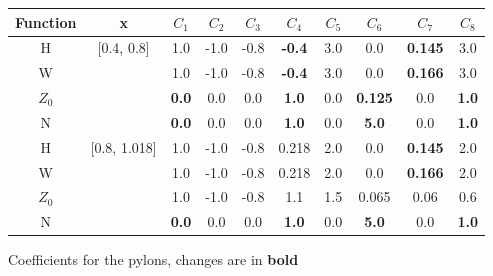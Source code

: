 \documentclass[12pt]{article}
\begin{document}
\begin{figure}[ht]
\begin{centering}
\begin{small}
\begin{tabular}{cccccccccc}
Function & x & $C_{1}$ & $C_{2}$ & $C_{3}$ & $C_{4}$ & $C_{5}$ & $C_{6}$ & $C_{7}$ & $C_{8}$ \\
\hline
H          & [0.4, 0.8]  & 1.0             & -1.0 & -0.8 & \textbf{-0.4} & 3.0 & 0.0                  & \textbf{0.145} & 3.0 \\
W          &                 & 1.0             & -1.0 & -0.8 & \textbf{-0.4} & 3.0 & 0.0                  & \textbf{0.166} & 3.0 \\
$Z_{0}$ &                 & \textbf{0.0} & 0.0  & 0.0  & \textbf{1.0}  & 0.0  & \textbf{0.125} & 0.0                 & \textbf{1.0} \\
N           &                 & \textbf{0.0} & 0.0  & 0.0  & \textbf{1.0}  & 0.0  & \textbf{5.0}     & 0.0                 & \textbf{1.0} \\
\hline
H          & [0.8, 1.018]  & 1.0             & -1.0 & -0.8 & 0.218         & 2.0 & 0.0                 & \textbf{0.145} & 2.0 \\
W          &                     & 1.0             & -1.0 & -0.8 & 0.218         & 2.0 & 0.0                 & \textbf{0.166} & 2.0 \\
$Z_{0}$ &                     & 1.0             & -1.0 & -0.8 & 1.1             & 1.5 & 0.065             & 0.06               & 0.6 \\
N           &                     & \textbf{0.0} & 0.0  & 0.0  & \textbf{1.0} & 0.0 & \textbf{5.0}     & 0.0                 & \textbf{1.0} \\
\end{tabular}
\caption{Coefficients for the pylons, changes are in \textbf{bold}}
\label{pycoeff}
\end{small}
\end{centering}\end{figure}%
\end{document}
